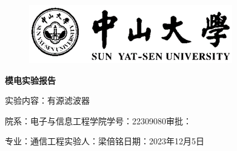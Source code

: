 \documentclass[a4paper,10pt,notitlepage]{article}
\begin{document}
	\large
	\onehalfspacing
	\begin{figure}[h]
		\raggedright
		\includegraphics{1.png}
	\end{figure}
	\centering
	{\Huge\textbf{模电实验报告}\par}
	\vspace{0.2cm}
	{\huge{实验内容：有源滤波器}\par}
	\raggedright
	\vspace{0.3cm}
	\begin{centering}
		{\large 院系：电子与信息工程学院\hfill 学号：22309080\hfill 审批：\hspace{2cm} \par
			专业：通信工程\hfill 实验人：梁倍铭\hfill 日期：2023年12月5日 \par}
	\end{centering}
	\vspace{0.3cm}
\end{document}
